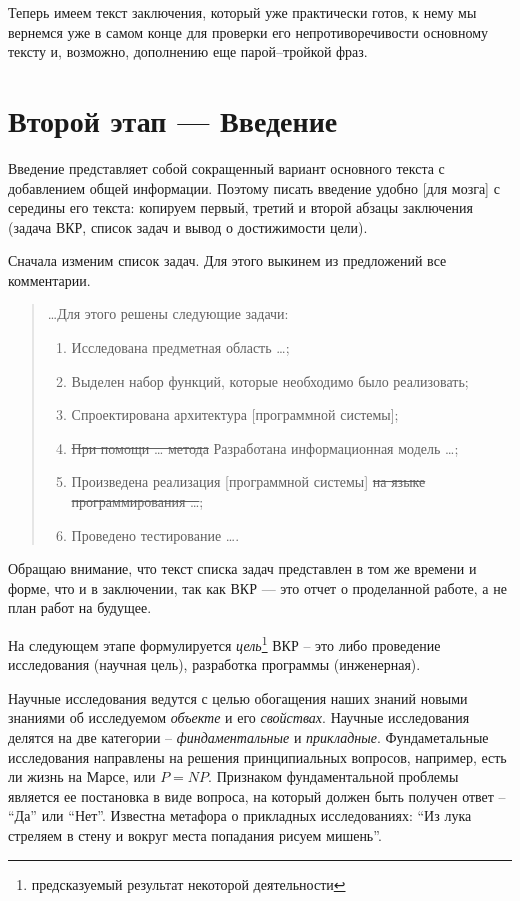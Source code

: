 \documentclass[a4paper,14pt,final]{extreport}
\begin{document}
Теперь имеем текст заключения, который уже практически готов, к нему мы вернемся уже в самом конце для проверки его непротиворечивости основному тексту и, возможно, дополнению еще парой--тройкой фраз.

\section{Второй этап --- Введение}
\label{sec:intro}

Введение представляет собой сокращенный вариант основного текста с добавлением общей информации.  Поэтому писать введение удобно [для мозга] с середины его текста: копируем первый, третий и второй абзацы заключения (задача ВКР, список задач и вывод о достижимости цели).

Сначала изменим список задач.  Для этого выкинем из предложений все комментарии.
\begin{quote}
\ldots Для этого решены следующие задачи:
\begin{enumerate}
\item Исследована предметная область \ldots{};
\item Выделен набор функций, которые необходимо было реализовать;
\item Спроектирована архитектура [программной системы];
\item \sout{При помощи \ldots{} метода} Разработана информационная модель \ldots{};
\item Произведена реализация [программной системы] \sout{на языке программирования \ldots{}};
\item Проведено тестирование \ldots{}.
\end{enumerate}
\end{quote}
Обращаю внимание, что текст списка задач представлен в том же времени и форме, что и в заключении, так как ВКР --- это отчет о проделанной работе, а не план работ на будущее.

На следующем этапе формулируется \emph{цель}\footnote{предсказуемый результат некоторой деятельности} ВКР -- это либо проведение исследования (научная цель), разработка программы (инженерная).

Научные исследования ведутся с целью обогащения наших знаний новыми знаниями об исследуемом \emph{объекте} и его \emph{свойствах}.  Научные исследования делятся на две категории -- \emph{финдаментальные} и \emph{прикладные}.  Фундаметальные исследования направлены на решения принципиальных вопросов, например, есть ли жизнь на Марсе, или $P=NP$.  Признаком фундаментальной проблемы является ее постановка в виде вопроса, на который должен быть получен ответ -- ``Да'' или ``Нет''.  Известна метафора о прикладных исследованиях: ``Из лука стреляем в стену и вокруг места попадания рисуем мишень''.
\end{document}

